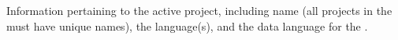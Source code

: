 
\item[Project Properties]{
Information pertaining to the active project, including  name (all projects in the \gddb must have 
unique names), the \gdproject language(s), and the data language for the 
\gdproject{}. 
}
